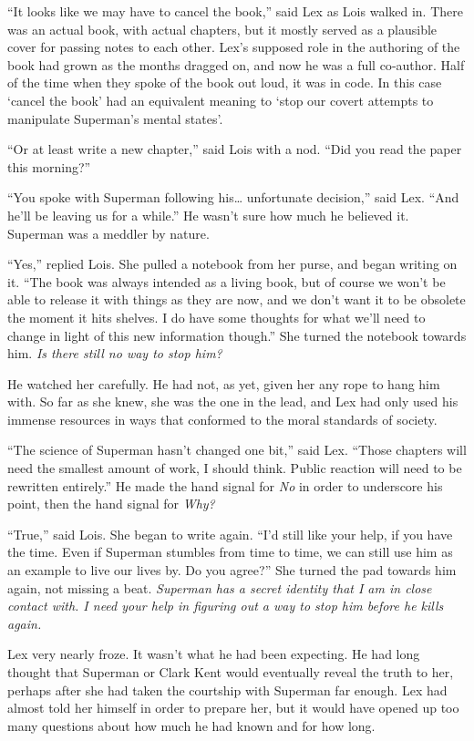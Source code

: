 \documentclass[ebook,12pt]{memoir}
\begin{document}
``It looks like we may have to cancel the book,'' said Lex as Lois
walked in. There was an actual book, with actual chapters, but it mostly
served as a plausible cover for passing notes to each other. Lex's
supposed role in the authoring of the book had grown as the months
dragged on, and now he was a full co‐author. Half of the time when they
spoke of the book out loud, it was in code. In this case `cancel the
book' had an equivalent meaning to `stop our covert attempts to
manipulate Superman's mental states'.

``Or at least write a new chapter,'' said Lois with a nod. ``Did you
read the paper this morning?''

``You spoke with Superman following his\ldots{} unfortunate decision,''
said Lex. ``And he'll be leaving us for a while.'' He wasn't sure how
much he believed it. Superman was a meddler by nature.

``Yes,'' replied Lois. She pulled a notebook from her purse, and began
writing on it. ``The book was always intended as a living book, but of
course we won't be able to release it with things as they are now, and
we don't want it to be obsolete the moment it hits shelves. I do have
some thoughts for what we'll need to change in light of this new
information though.'' She turned the notebook towards him. \emph{Is
there still no way to stop him?}

He watched her carefully. He had not, as yet, given her any rope to hang
him with. So far as she knew, she was the one in the lead, and Lex had
only used his immense resources in ways that conformed to the moral
standards of society.

``The science of Superman hasn't changed one bit,'' said Lex. ``Those
chapters will need the smallest amount of work, I should think. Public
reaction will need to be rewritten entirely.'' He made the hand signal
for \emph{No} in order to underscore his point, then the hand signal for
\emph{Why?}

``True,'' said Lois. She began to write again. ``I'd still like your
help, if you have the time. Even if Superman stumbles from time to time,
we can still use him as an example to live our lives by. Do you agree?''
She turned the pad towards him again, not missing a beat. \emph{Superman
has a secret identity that I am in close contact with. I need your help
in figuring out a way to stop him before he kills again.}

Lex very nearly froze. It wasn't what he had been expecting. He had long
thought that Superman or Clark Kent would eventually reveal the truth to
her, perhaps after she had taken the courtship with Superman far enough.
Lex had almost told her himself in order to prepare her, but it would
have opened up too many questions about how much he had known and for
how long.
\end{document}
